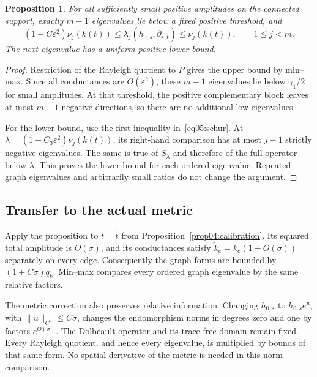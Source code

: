 \documentclass[11pt]{amsart}
\newtheorem{proposition}[theorem]{Proposition}
\theoremstyle{definition}
\theoremstyle{remark}
\newcommand{\db}{\bar\partial}
\begin{document}
\begin{proposition}\label{prop05:harmonicspectrum}
For all sufficiently small positive amplitudes on the connected
support, exactly \(m-1\) eigenvalues lie below a fixed positive
threshold, and
\begin{equation}\label{eq05:relative}
 (1-C\varepsilon^2)\nu_j(k(t))
 \leq\lambda_j(h_{0,s},\db_{s,t})
 \leq\nu_j(k(t)),\qquad 1\leq j<m.
\end{equation}
The next eigenvalue has a uniform positive lower bound.
\end{proposition}

\begin{proof}
Restriction of the Rayleigh quotient to \(P\) gives the upper
bound by min--max. Since all conductances are \(O(\varepsilon^2)\),
these \(m-1\) eigenvalues lie below \(\gamma_1/2\) for small
amplitudes. At that threshold, the positive complementary block
leaves at most \(m-1\) negative directions, so there are no
additional low eigenvalues.

For the lower bound, use the first inequality
in~\eqref{eq05:schur}. At
\(\lambda=(1-C_3\varepsilon^2)\nu_j(k(t))\), its right-hand
comparison has at most \(j-1\) strictly negative eigenvalues.
The same is true of \(S_\lambda\) and therefore of the full
operator below \(\lambda\). This proves the lower bound for
each ordered eigenvalue. Repeated graph eigenvalues and
arbitrarily small ratios do not change the argument.
\end{proof}

\subsection{Transfer to the actual metric}

Apply the proposition to \(t=\widetilde t\) from
Proposition~\ref{prop04:calibration}. Its squared total amplitude
is \(O(\sigma)\), and its conductances satisfy
\(\widetilde k_e=k_e(1+O(\sigma))\) separately on every edge.
Consequently the graph forms are bounded by
\((1\pm C\sigma)q_k\). Min--max compares every ordered graph
eigenvalue by the same relative factors.

The metric correction also preserves relative information.
Changing \(h_{0,s}\) to \(h_{0,s}e^u\), with
\(\|u\|_{C^0}\leq C\sigma\), changes the endomorphism
norms in degrees zero and one by factors \(e^{O(\sigma)}\).
The Dolbeault operator and its trace-free domain remain fixed.
Every Rayleigh quotient, and hence every eigenvalue, is
multiplied by bounds of that same form. No spatial derivative
of the metric is needed in this norm comparison.
\end{document}
